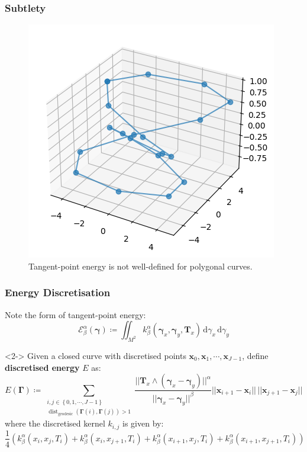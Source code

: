 \documentclass{beamer}
\theoremstyle{remark}
\newcommand{\gammabf}{\boldsymbol{\gamma}}
\newcommand{\Gammabf}{\boldsymbol{\Gamma}}
\newcommand{\xbf}{\mathbf{x}}
\newcommand{\intd}{\, \text{d}}
\newcommand{\norm}[1]{\lvert \lvert #1 \rvert \rvert}
\DeclareMathOperator{\dist}{dist}
\begin{document}
\begin{frame}
    \frametitle{Subtlety}
    \begin{figure}[h]
        \centering
        \includegraphics[scale=0.5]{discretization-only}
        \caption{Tangent-point energy is not well-defined for polygonal curves.}
    \end{figure}
\end{frame}

\begin{frame}
    \frametitle{Energy Discretisation}
    Note the form of tangent-point energy:
        \begin{equation}
            \mathcal{E}_{\beta}^{\alpha} \left( \gammabf \right) \coloneqq \iint_{M^2} k_{\beta}^{\alpha} \left( \gammabf_x, \gammabf_y, \mathbf{T}_x \right) \intd \gamma_x \intd \gamma_y
        \end{equation}

    \begin{definition}<2->
        Given a closed curve with discretised points $\xbf_0, \xbf_1, \cdots, \xbf_{J-1}$,
        define \textbf{discretised energy} $E$ as:
        \begin{equation*}
            E \left( \Gammabf \right) \coloneqq \sum_{\substack{i, j \in \left\{ 0, 1, \cdots, J-1 \right\} \\ \dist_{\text{geodesic}} \left( \Gammabf(i), \Gammabf(j) \right) > 1}} 
            \frac{\norm{\mathbf{T}_x \wedge \left( \gammabf_x - \gammabf_y \right)}^{\alpha}}{\norm{\gammabf_x - \gammabf_y}^{\beta}}
            \norm{\xbf_{i+1} - \xbf_{i}} \, \norm{\xbf_{j+1} - \xbf_{j}}
        \end{equation*}
        where the discretised kernel $k_{i,j}$ is given by:
        \begin{equation*}
            \frac{1}{4} \left( 
                k_{\beta}^{\alpha} \left( x_i, x_j, T_i \right)
                + k_{\beta}^{\alpha} \left( x_i, x_{j+1}, T_i \right)
                + k_{\beta}^{\alpha} \left( x_{i+1}, x_j, T_i \right)
            + k_{\beta}^{\alpha} \left( x_{i+1}, x_{j+1}, T_i \right) \right)
        \end{equation*}
    \end{definition}
\end{frame}
\end{document}
